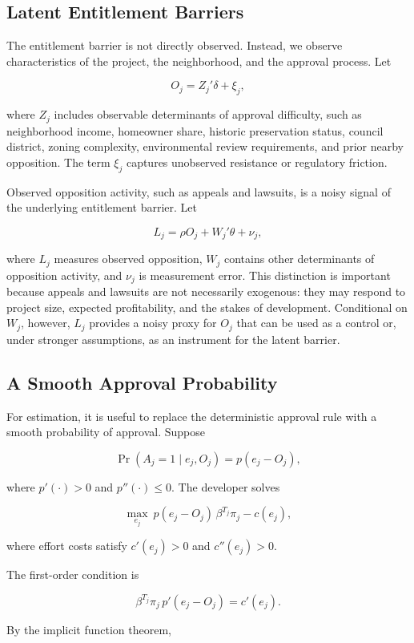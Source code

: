 \documentclass[12pt]{article}
\theoremstyle{definition}
\begin{document}
\subsection{Latent Entitlement Barriers}

The entitlement barrier is not directly observed. Instead, we observe characteristics of the project, the neighborhood, and the approval process. Let

\[
O_j = Z_j'\delta + \xi_j,
\]

where $Z_j$ includes observable determinants of approval difficulty, such as neighborhood income, homeowner share, historic preservation status, council district, zoning complexity, environmental review requirements, and prior nearby opposition. The term $\xi_j$ captures unobserved resistance or regulatory friction.

Observed opposition activity, such as appeals and lawsuits, is a noisy signal of the underlying entitlement barrier. Let

\[
L_j = \rho O_j + W_j'\theta + \nu_j,
\]

where $L_j$ measures observed opposition, $W_j$ contains other determinants of opposition activity, and $\nu_j$ is measurement error. This distinction is important because appeals and lawsuits are not necessarily exogenous: they may respond to project size, expected profitability, and the stakes of development. Conditional on $W_j$, however, $L_j$ provides a noisy proxy for $O_j$ that can be used as a control or, under stronger assumptions, as an instrument for the latent barrier.

\subsection{A Smooth Approval Probability}

For estimation, it is useful to replace the deterministic approval rule with a smooth probability of approval. Suppose

\[
\Pr(A_j = 1 \mid e_j, O_j) = p(e_j - O_j),
\]

where $p'(\cdot)>0$ and $p''(\cdot)\leq 0$. The developer solves

\[
\max_{e_j} \ p(e_j - O_j)\,\beta^{T_j}\pi_j - c(e_j),
\]

where effort costs satisfy $c'(e_j)>0$ and $c''(e_j)>0$.

The first-order condition is

\[
\beta^{T_j}\pi_j\, p'(e_j - O_j) = c'(e_j).
\]

By the implicit function theorem,
\end{document}
